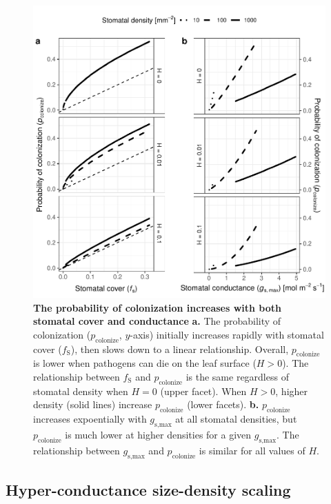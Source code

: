 \documentclass[utf8]{frontiersSCNS}
\newcommand{\fs}{$f_\text{S}$}
\newcommand{\gsmax}{$g_\text{s,max}$}
\begin{document}
\begin{figure}
  \centering
    \includegraphics{../figures/fig3.pdf}
    \caption{\textbf{The probability of colonization increases with both stomatal cover and conductance} \textbf{a.} The probability of colonization ($p_\text{colonize}$, $y$-axis) initially increases rapidly with stomatal cover (\fs), then slows down to a linear relationship. Overall, $p_\text{colonize}$ is lower when pathogens can die on the leaf surface ($H > 0$). The relationship between \fs{} and $p_\text{colonize}$ is the same regardless of stomatal density when $H = 0$ (upper facet). When $H > 0$, higher density (solid lines) increase $p_\text{colonize}$ (lower facets). \textbf{b.} $p_\text{colonize}$ increases expoentially with \gsmax{} at all stomatal densities, but $p_\text{colonize}$ is much lower at higher densities for a given \gsmax. The relationship between \gsmax{} and $p_\text{colonize}$ is similar for all values of $H$.}
    \label{fig:fig3}
\end{figure}

\hypertarget{hyper-conductance-size-density-scaling}{%
\subsection*{Hyper-conductance size-density
scaling}\label{hyper-conductance-size-density-scaling}}
\end{document}
